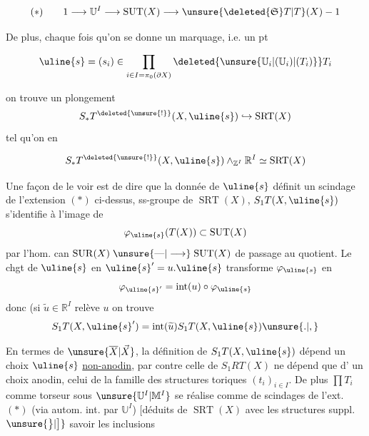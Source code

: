 \[
(*)\qquad1\longrightarrow\mathbb U^I\longrightarrow
\operatorname{SUT}(X)\longrightarrow
\unsure{\deleted{\mathfrak S}T|T}(X)-1
\]

De plus, chaque fois qu'on se donne un
marquage, i.e. un pt 

\[
\uline{s}=(s_i)\in
\prod_{i\in I=\pi_0(\partial X)}
\deleted{\unsure{\mathbb U_i|(\mathbb U_i)|(T_i)}}T_i
\]


on trouve un plongement
\[
S_*T^{\deleted{\unsure{!}}}(X,\uline{s})\hookrightarrow\operatorname{SRT}(X)
\]
tel qu'on en 

\[
S_*T^{\deleted{\unsure{!}}}(X,\uline{s})
\mathbin{\wedge}_{\mathbb Z^I}\mathbb R^I
\simeq\operatorname{SRT}(X)
\]



Une façon de le voir est de dire que
la donnée de $\uline{s}$ définit un scindage
 de
l'extension $(*)$ ci-dessus, 
ss-groupe de $\operatorname{SRT}(X)$,
$S_1T(X,\uline{s})$ s'identifie
à l'image  de
\[
\varphi_{\uline{s}}(T(X))\subset\operatorname{SUT}(X)
\]
par l'hom. can
$\operatorname{SUR}(X)\mathrel{\unsure{\text{---}|\longrightarrow}}\operatorname{SUT}(X)$
de passage au quotient. Le chgt de
$\uline{s}$ en $\uline{s}'=u.\uline{s}$
transforme $\varphi_{\uline{s}}$ en
\[
\varphi_{\uline{s}'}=\operatorname{int}(u)\circ\varphi_{\uline{s}}
\]
donc (si $\widetilde u\in\mathbb R^I$ relève $u$\unsure{,|)} on trouve
\[
S_1T(X,\uline{s}')
=\operatorname{int}(\widetilde u)S_1T(X,\uline{s})\unsure{.|,}
\]

En termes de $\unsure{\overline X|\vec X}$, la définition de
$S_1T(X,\uline{s})$
dépend un choix $\uline{s}$ \uline{non-anodin},
par contre celle de $S_1RT(X)$ ne dépend que d'
un choix anodin, celui de la famille des
structures toriques $(t_i)_{i\in I}$.
De plus $\prod T_i$ comme
torseur sous $\unsure{\mathbb U^I|\mathbb M^I}$ se réalise
comme  de scindages de l'ext. $(*)$
(via autom. int. par $\mathbb U^I$)
$\bigl[$déduits de $\operatorname{SRT}(X)$
avec les structures suppl.$\unsure{\bigr\}|\bigr]}$
savoir\unsure{)|,} les inclusions

